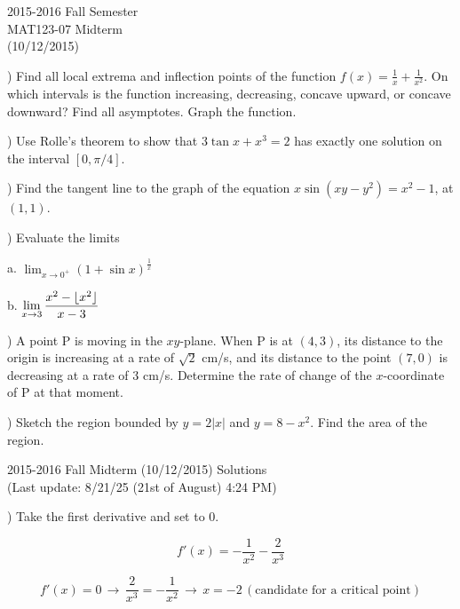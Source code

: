 \documentclass{article}
\DeclarePairedDelimiter\floor{\lfloor}{\rfloor}
\begin{document}
\pagestyle{empty}
\large

\begin{center}
2015-2016 Fall Semester\\MAT123-07 Midterm\\(10/12/2015)
\end{center}

) Find all local extrema and inflection points of the function $f(x) = \frac{1}{x} + \frac{1}{x^2}$. On which intervals is the function increasing, decreasing, concave upward, or concave downward? Find all asymptotes. Graph the function.


\hfill

) Use Rolle's theorem to show that $3\tan x + x^3 = 2$ has exactly one solution on the interval $[0,\pi/4]$.

\hfill

) Find the tangent line to the graph of the equation $x \sin(xy-y^2) = x^2-1$, at $(1,1)$.

\hfill

) Evaluate the limits

a. $\displaystyle \lim_{x\to 0^+} (1+\sin x)^{\frac{1}{x}}$

b. $\displaystyle \lim_{x\to 3} \frac{x^2-\floor{x^2}}{x-3}$

\hfill

) A point P is moving in the $xy$-plane. When P is at $(4, 3)$, its distance to the origin is increasing at a rate of $\sqrt{2}$ cm/s, and its distance to the point $(7, 0)$ is decreasing at a rate of 3 cm/s. Determine the rate of change of the $x$-coordinate of P at that moment.

\hfill

) Sketch the region bounded by $y=2|x|$ and $y=8-x^2$. Find the area of the region.

\newpage

\begin{center}
2015-2016 Fall Midterm (10/12/2015) Solutions\\
(Last update: 8/21/25 (21st of August) 4:24 PM)
\end{center}

) Take the first derivative and set to 0.

\[f'(x) = -\frac{1}{x^2} - \frac{2}{x^3}\]

\[f'(x) = 0\,\rightarrow\,\frac{2}{x^3} = -\frac{1}{x^2}\,\rightarrow\,x = -2 \, (\text{candidate for a critical point})\]
\end{document}
